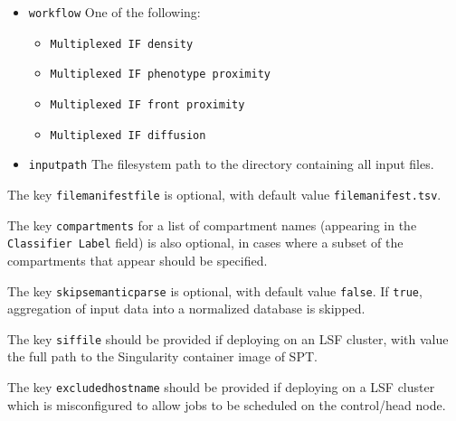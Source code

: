 \documentclass[14pt]{article}
\begin{document}
\begin{itemize}
  \itemsep0em
  \item[]{ \colorbox{yellow!25}{\texttt{workflow}} One of the following: \begin{itemize}\itemsep0em\item[]{\colorbox{gray!20}{\texttt{Multiplexed IF density}}} \item[]{\colorbox{gray!20}{\texttt{Multiplexed IF phenotype proximity}}} \item[]{\colorbox{gray!20}{\texttt{Multiplexed IF front proximity}}} \item[]{\colorbox{gray!20}{\texttt{Multiplexed IF diffusion}}} \end{itemize}}
  \item[]{ \colorbox{yellow!25}{\texttt{input{\textunderscore}path}} The filesystem path to the directory containing all input files.}
\end{itemize}

The key \colorbox{yellow!25}{\texttt{file{\textunderscore}manifest{\textunderscore}file}} is optional, with default value \colorbox{gray!20}{\texttt{file{\textunderscore}manifest.tsv}}.

The key \colorbox{yellow!25}{\texttt{compartments}} for a list of compartment names (appearing in the \colorbox{yellow!25}{\texttt{Classifier Label}} field) is also optional, in cases where a subset of the compartments that appear should be specified.

The key \colorbox{yellow!25}{\texttt{skip{\textunderscore}semantic{\textunderscore}parse}} is optional, with default value \colorbox{gray!20}{\texttt{false}}. If \colorbox{gray!20}{\texttt{true}}, aggregation of input data into a normalized database is skipped.

The key \colorbox{yellow!25}{\texttt{sif{\textunderscore}file}} should be provided if deploying on an LSF cluster, with value the full path to the Singularity container image of SPT.

The key \colorbox{yellow!25}{\texttt{excluded{\textunderscore}host{\textunderscore}name}} should be provided if deploying on a LSF cluster which is misconfigured to allow jobs to be scheduled on the control/head node.
\end{document}
